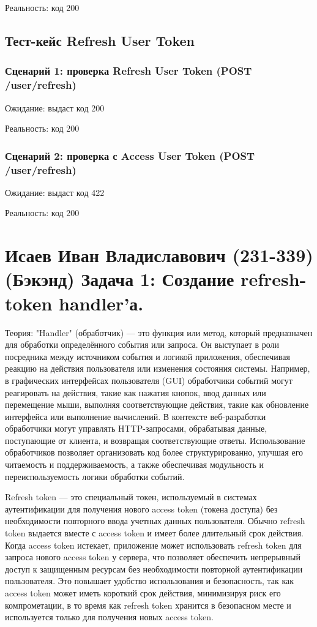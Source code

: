\documentclass[a4paper,12pt]{article}
\begin{document}
Реальность: код 200



\subsection*{Тест-кейс Refresh User Token}

\subsubsection*{Сценарий 1: проверка Refresh User Token (POST /user/refresh)}
Ожидание: выдаст код 200

Реальность: код 200



\subsubsection*{Сценарий 2: проверка с Access User Token (POST /user/refresh)}
Ожидание: выдаст код 422

Реальность: код 200



\newpage

\section{Исаев Иван Владиславович  (231-339)(Бэкэнд) Задача 1: Создание refresh-token handler’а.}

Теория:
"Handler" (обработчик) — это функция или метод, который предназначен для обработки определённого события или запроса. Он выступает в роли посредника между источником события и логикой приложения, обеспечивая реакцию на действия пользователя или изменения состояния системы. Например, в графических интерфейсах пользователя (GUI) обработчики событий могут реагировать на действия, такие как нажатия кнопок, ввод данных или перемещение мыши, выполняя соответствующие действия, такие как обновление интерфейса или выполнение вычислений. В контексте веб-разработки обработчики могут управлять HTTP-запросами, обрабатывая данные, поступающие от клиента, и возвращая соответствующие ответы. Использование обработчиков позволяет организовать код более структурированно, улучшая его читаемость и поддерживаемость, а также обеспечивая модульность и переиспользуемость логики обработки событий.

Refresh token — это специальный токен, используемый в системах аутентификации для получения нового access token (токена доступа) без необходимости повторного ввода учетных данных пользователя. Обычно refresh token выдается вместе с access token и имеет более длительный срок действия. Когда access token истекает, приложение может использовать refresh token для запроса нового access token у сервера, что позволяет обеспечить непрерывный доступ к защищенным ресурсам без необходимости повторной аутентификации пользователя. Это повышает удобство использования и безопасность, так как access token может иметь короткий срок действия, минимизируя риск его компрометации, в то время как refresh token хранится в безопасном месте и используется только для получения новых access token.
\end{document}
